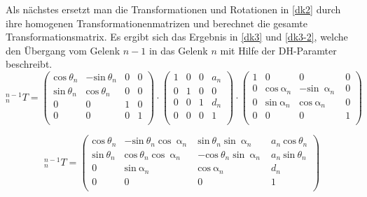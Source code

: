 Als nächstes ersetzt man die Transformationen und Rotationen in \autoref{dk2} durch ihre homogenen Transformationenmatrizen und berechnet die gesamte Transformationsmatrix. Es ergibt sich das Ergebnis in \autoref{dk3} und \ref{dk3-2}, welche den Übergang vom Gelenk $n - 1$ in das Gelenk $n$ mit Hilfe der DH-Paramter beschreibt.
\begin{equation}
  ^{n-1}_{n}T = \begin{pmatrix}
    \textrm{cos}\: \theta_n & -\textrm{sin}\: \theta_n  & 0 & 0\\ 
    \textrm{sin}\: \theta_n & \textrm{cos}\: \theta_n   & 0 & 0\\ 
    0             & 0               & 1 & 0\\ 
    0             & 0               & 0 & 1\\
\end{pmatrix} \cdot
\begin{pmatrix}
  1 & 0 & 0 & a_n\\ 
  0 & 1 & 0 & 0\\ 
  0 & 0 & 1 & d_n\\ 
  0 & 0 & 0 & 1\\
\end{pmatrix} \cdot \begin{pmatrix}
  1 & 0 & 0 & 0\\ 
  0 & \textrm{cos}\: \upalpha_n & -\textrm{sin}\: \upalpha_n & 0\\ 
  0 & \textrm{sin}\: \upalpha_n & \textrm{cos}\: \upalpha_n & 0\\ 
  0 & 0 & 0 & 1\\
\end{pmatrix}
\label{dk3}
\end{equation}

\begin{equation}
^{n-1}_{n}T = \begin{pmatrix}
  \textrm{cos}\: \theta_n  & -\textrm{sin}\: \theta_n\; \textrm{cos}\: \upalpha_n    & \textrm{sin}\: \theta_n\; \textrm{sin}\: \upalpha_n & a_n\: \textrm{cos}\: \theta_n\\ 
  \textrm{sin}\: \theta_n  & \textrm{cos}\: \theta_n\; \textrm{cos}\: \upalpha_n     & -\textrm{cos}\: \theta_n\; \textrm{sin}\: \upalpha_n & a_n\: \textrm{sin}\: \theta_n\\ 
  0               & \textrm{sin}\: \upalpha_n                & \textrm{cos}\: \upalpha_n & d_n\\ 
  0               & 0                             & 0 & 1\\
\end{pmatrix}
\label{dk3-2}
\end{equation}

